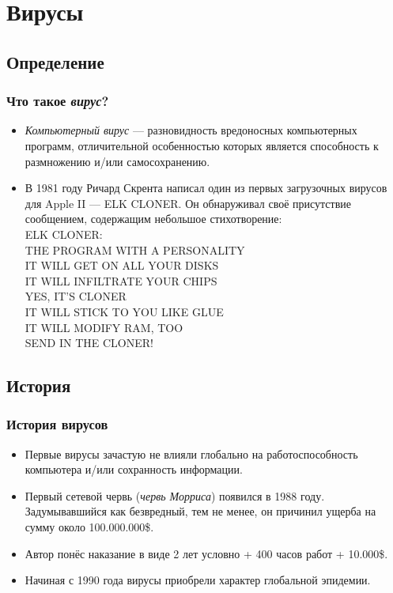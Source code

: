 \documentclass[compress,red]{beamer}
\begin{document}
\section{Вирусы}
\subsection{Определение}
\begin{frame}
  \frametitle{Что такое \emph{вирус}?}
	\begin{itemize}[<+->]
	\item \emph{Компьютерный вирус} --- разновидность вредоносных компьютерных программ, отличительной особенностью которых является способность к размножению и/или самосохранению.
	\item В 1981 году Ричард Скрента написал один из первых загрузочных вирусов для Apple II — ELK CLONER. Он обнаруживал своё присутствие сообщением, содержащим небольшое стихотворение: \\
	\scriptsize{
    ELK CLONER:\\ 
    THE PROGRAM WITH A PERSONALITY\\
    IT WILL GET ON ALL YOUR DISKS\\
    IT WILL INFILTRATE YOUR CHIPS\\
    YES, IT'S CLONER\\
    IT WILL STICK TO YOU LIKE GLUE\\
    IT WILL MODIFY RAM, TOO\\
    SEND IN THE CLONER!\\}
	\end{itemize}
\end{frame}

\subsection{История}
\begin{frame}
  \frametitle{История вирусов}
	\begin{itemize}[<+->]
	  \item Первые вирусы зачастую не влияли глобально на работоспособность компьютера и/или сохранность информации.
	  \item Первый сетевой червь (\emph{червь Морриса}) появился в 1988 году. Задумывавшийся как безвредный, тем не менее, он причинил ущерба на сумму около 100.000.000\$.
	  \item Автор понёс наказание в виде 2 лет условно + 400 часов работ + 10.000\$.
	  \item Начиная с 1990 года вирусы приобрели характер глобальной эпидемии.
	\end{itemize}
\end{frame}
\end{document}
